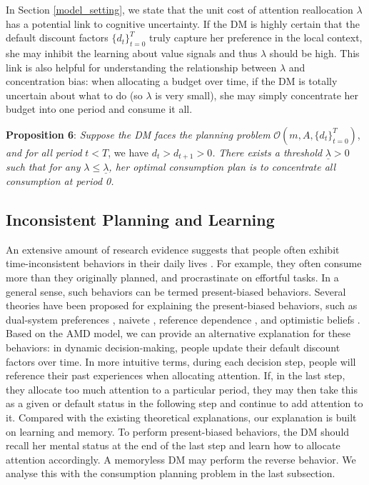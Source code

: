 \documentclass[
  12pt,
]{article}
\begin{document}
In Section \ref{model_setting}, we state that the unit cost of attention
reallocation \(\lambda\) has a potential link to cognitive uncertainty.
If the DM is highly certain that the default discount factors
\(\{d_t\}_{t=0}^T\) truly capture her preference in the local context,
she may inhibit the learning about value signals and thus \(\lambda\)
should be high. This link is also helpful for understanding the
relationship between \(\lambda\) and concentration bias: when allocating
a budget over time, if the DM is totally uncertain about what to do (so
\(\lambda\) is very small), she may simply concentrate her budget into
one period and consume it all.

\noindent \textbf{Proposition 6}: \emph{Suppose the DM faces the
planning problem} \(\mathcal{O}(m,A,\{d_t\}_{t=0}^T)\), \emph{and for
all period} \(t<T\), we have \(d_t >d_{t+1}>0\)\emph{.} \emph{There
exists a threshold} \(\underline{\lambda}>0\) \emph{such that for any}
\(\lambda\leq\underline{\lambda}\)\emph{, her optimal consumption plan
is to concentrate all consumption at period 0.}

\hypertarget{inconsistent-planning-and-learning}{%
\subsection{\texorpdfstring{Inconsistent Planning and Learning
\label{inconsistent}}{Inconsistent Planning and Learning }}\label{inconsistent-planning-and-learning}}

An extensive amount of research evidence suggests that people often
exhibit time-inconsistent behaviors in their daily lives
\citep{ericson2019intertemporal}. For example, they often consume more
than they originally planned, and procrastinate on effortful tasks. In a
general sense, such behaviors can be termed present-biased behaviors.
Several theories have been proposed for explaining the present-biased
behaviors, such as dual-system preferences \citep{laibson1997golden},
naivete \citep{o1999doing}, reference dependence
\citep{kHoszegi2009reference}, and optimistic beliefs
\citep{brunnermeier2017optimal}. Based on the AMD model, we can provide
an alternative explanation for these behaviors: in dynamic
decision-making, people update their default discount factors over time.
In more intuitive terms, during each decision step, people will
reference their past experiences when allocating attention. If, in the
last step, they allocate too much attention to a particular period, they
may then take this as a given or default status in the following step
and continue to add attention to it. Compared with the existing
theoretical explanations, our explanation is built on learning and
memory. To perform present-biased behaviors, the DM should recall her
mental status at the end of the last step and learn how to allocate
attention accordingly. A memoryless DM may perform the reverse behavior.
We analyse this with the consumption planning problem in the last
subsection.
\end{document}
